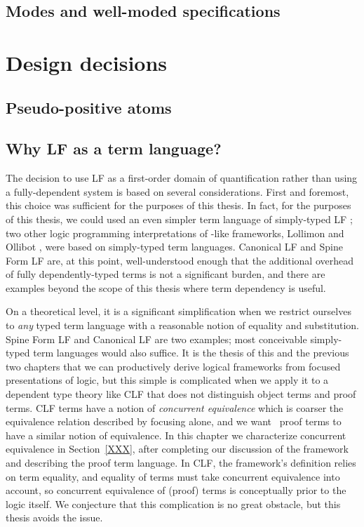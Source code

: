 \subsection{Modes and well-moded specifications}
\label{sec:framework-modes}

\section{Design decisions}
\label{sec:designdecisions}

\subsection{Pseudo-positive atoms}
\label{sec:pseudopositive}


\subsection{Why LF as a term language?}
\label{sec:why-not-fully-dependent}

The decision to use LF as a first-order domain of quantification
rather than using a fully-dependent system is based on several
considerations. First and foremost, this choice was sufficient for the
purposes of this thesis. In fact, for the purposes of this thesis, we
could used an even simpler term language of simply-typed LF
\cite{pfenning08church}; two other logic programming interpretations
of \sls-like frameworks, Lollimon \cite{lopez05monadic} and Ollibot
\cite{pfenning09substructural}, were based on simply-typed term
languages. Canonical LF and Spine Form LF are, at this point,
well-understood enough that the additional overhead of fully
dependently-typed terms is not a significant burden, and there are
examples beyond the scope of this thesis where term dependency is
useful.

On a theoretical level, it is a significant simplification when we
restrict ourselves to {\it any} typed term language with a reasonable
notion of equality and substitution. Spine Form LF and Canonical LF
are two examples; most conceivable simply-typed term languages would
also suffice. It is the thesis of this and the previous two chapters
that we can productively derive logical frameworks from focused
presentations of logic, but this simple is complicated when we apply it
to a dependent type theory like CLF that does not distinguish object
terms and proof terms. CLF terms have a notion of {\it concurrent
  equivalence} which is coarser the equivalence relation described by
focusing alone, and we want \sls~proof terms to have a similar notion
of equivalence. In this chapter we characterize concurrent equivalence
in Section~\ref{XXX}, after completing our discussion of the framework
and describing the proof term language.  In CLF, the framework's
definition relies on term equality, and equality of terms must take
concurrent equivalence into account, so concurrent equivalence of
(proof) terms is conceptually prior to the logic itself. We conjecture
that this complication is no great obstacle, but this thesis avoids
the issue.

